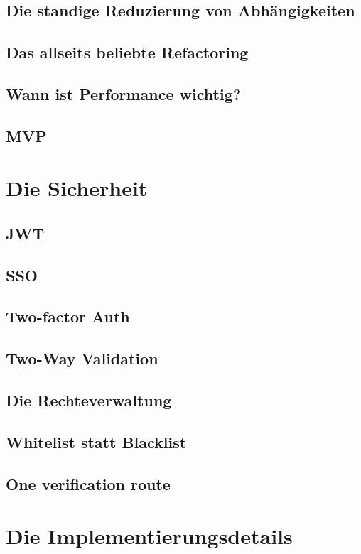 \section{Die standige Reduzierung von Abhängigkeiten}

\section{Das allseits beliebte Refactoring}

\section{Wann ist Performance wichtig?}

\section{MVP}

\chapter{Die Sicherheit}
\section{JWT}
\section{SSO}
\section{Two-factor Auth}
\section{Two-Way Validation}
\section{Die Rechteverwaltung}
\section{Whitelist statt Blacklist}
\section{One verification route}

\chapter{Die Implementierungsdetails}

